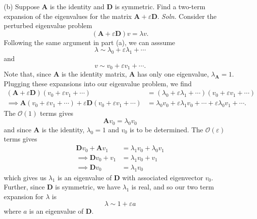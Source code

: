 \documentclass{article}
\begin{document}
\begin{itemize}
\begin{itemize}
        \item[(b)] Suppose $\mathbf{A}$ is the identity and $\mathbf{D}$ is symmetric. Find a two-term expansion of the eigenvalues for the matrix $\mathbf{A} + \varepsilon\mathbf{D}$.
        \newline\newline
        \textit{Soln.} Consider the perturbed eigenvalue problem
        \[(\mathbf{A} + \varepsilon \mathbf{D})v = \lambda v.\]
        Following the same argument in part (a), we can asssume
        \[\lambda \sim \lambda_0 + \varepsilon\lambda_1 + \cdots\]
        and 
        \[v \sim v_0 + \varepsilon v_1 + \cdots.\]
        Note that, since $\mathbf{A}$ is the identity matrix, $\mathbf{A}$ has only one eigenvalue, $\lambda_{\mathbf{A}} = 1$. Plugging these expansions into our eigenvalue problem, we find
        \begin{align*}
            (\mathbf{A} + \varepsilon\mathbf{D})(v_0 + \varepsilon v_1 + \cdots) &= (\lambda_0 + \varepsilon \lambda_1 + \cdots)(v_0 + \varepsilon v_1 + \cdots)\\
            \implies \mathbf{A}(v_0 + \varepsilon v_1 + \cdots) + \varepsilon\mathbf{D}(v_0 + \varepsilon v_1 + \cdots) &= \lambda_0v_0 + \varepsilon\lambda_1v_0 + \cdots + \varepsilon\lambda_0v_1 + \cdots.
        \end{align*}
        The $\mathcal{O}(1)$ terms gives 
        \[\mathbf{A}v_0 = \lambda_0v_0\]
        and since $\mathbf{A}$ is the identity, $\lambda_0 = 1$ and $v_0$ is to be determined. The $\mathcal{O}(\varepsilon)$ terms gives 
        \begin{align*}
            \mathbf{D}v_0 + \mathbf{A}v_1 &= \lambda_1v_0 + \lambda_0v_1\\
            \implies \mathbf{D}v_0 + v_1 &= \lambda_1v_0 + v_1\\
            \implies \mathbf{D}v_0 &= \lambda_1v_0
        \end{align*}
        which gives us $\lambda_1$ is an eigenvalue of $\mathbf{D}$ with associated eigenvector $v_0$. Further, since $\mathbf{D}$ is symmetric, we have $\lambda_1$ is real, and so our two term expansion for $\lambda$ is 
        \[\lambda \sim 1 + \varepsilon a\]
        where $a$ is an eigenvalue of $\mathbf{D}$.
        \newline\newline



\end{itemize}
\end{itemize}
\end{document}
